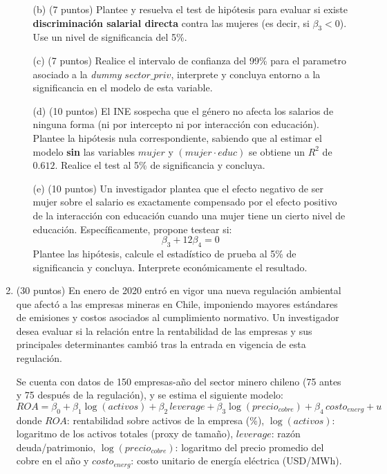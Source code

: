 \documentclass[10pt,a4paper]{article}
\begin{document}
\begin{enumerate}
\begin{enumerate}
    \item[(b)] (7 puntos) Plantee y resuelva el test de hipótesis para evaluar si existe \textbf{discriminación salarial directa} contra las mujeres (es decir, si $\beta_3 < 0$). Use un nivel de significancia del 5\%.

      \item[(c)] (7 puntos) Realice el intervalo de confianza del 99\% para el parametro asociado a la \textit{dummy} $sector\_priv$, interprete y concluya entorno a la significancia en el modelo de esta variable.
    
    \item[(d)] (10 puntos) El INE sospecha que el género no afecta los salarios de ninguna forma (ni por intercepto ni por interacción con educación). Plantee la hipótesis nula correspondiente, sabiendo que al estimar el modelo \textbf{sin} las variables $mujer$ y $(mujer \cdot educ)$ se obtiene un $R^2$ de $0.612$. Realice el test al 5\% de significancia y concluya.
    
    \item[(e)] (10 puntos) Un investigador plantea que el efecto negativo de ser mujer sobre el salario es exactamente compensado por el efecto positivo de la interacción con educación cuando una mujer tiene un cierto nivel de educación. Específicamente, propone testear si:
    \[
    \beta_3 + 12 \beta_4 = 0
    \]
    Plantee las hipótesis, calcule el estadístico de prueba al 5\% de significancia y concluya. Interprete económicamente el resultado.
    
\end{enumerate}




\item (30 puntos) En enero de 2020 entró en vigor una nueva regulación ambiental que afectó a las empresas mineras en Chile, imponiendo mayores estándares de emisiones y costos asociados al cumplimiento normativo. Un investigador desea evaluar si la relación entre la rentabilidad de las empresas y sus principales determinantes cambió tras la entrada en vigencia de esta regulación. 

Se cuenta con datos de 150 empresas-año del sector minero chileno (75 antes y 75 después de la regulación), y se estima el siguiente modelo:
\[
ROA = \beta_0 + \beta_1 \log(activos) + \beta_2 \, leverage + \beta_3 \log(precio_{cobre}) + \beta_4 \, costo_{energ} + u
\]
donde $ROA$: rentabilidad sobre activos de la empresa (\%), $\log(activos)$: logaritmo de los activos totales (proxy de tamaño), $leverage$: razón deuda/patrimonio, $\log(precio_{cobre})$: logaritmo del precio promedio del cobre en el año y $costo_{energ}$: costo unitario de energía eléctrica (USD/MWh).


\end{enumerate}
\end{document}
